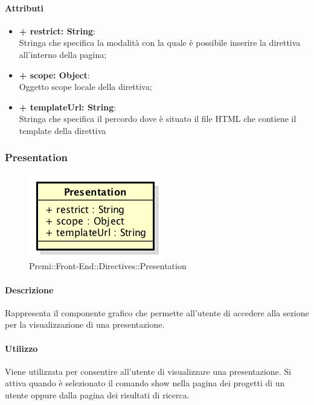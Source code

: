 	\paragraph{Attributi}
	\begin{itemize}
		\item \textbf{+ restrict: String}:\\
		Stringa che specifica la modalità con la quale è possibile inserire la direttiva all'interno della pagina;
		\item \textbf{+ scope: Object}:\\
		Oggetto scope locale della direttiva;
		\item \textbf{+ templateUrl: String}:\\
		Stringa che specifica il percordo dove è situato il file HTML che contiene il template della direttiva
	\end{itemize}
\newpage	
	

\subsubsection{Presentation}
	\begin{figure}[h]
		\centering
		\includegraphics[width=0.5\linewidth]{img/premi_front_end_directives_presentation}
		\caption[Premi::Front-End::Directives::Presentation]{Premi::Front-End::Directives::Presentation}
	\end{figure}
	
	\paragraph{Descrizione}
	Rappresenta il componente grafico che permette all'utente di accedere alla sezione per la visualizzazione di una presentazione.
	
	\paragraph{Utilizzo}
	Viene utilizzata per consentire all'utente di visualizzare una presentazione. Si attiva quando è selezionato il comando show nella pagina dei progetti di un utente oppure dalla pagina dei risultati di ricerca.
	
